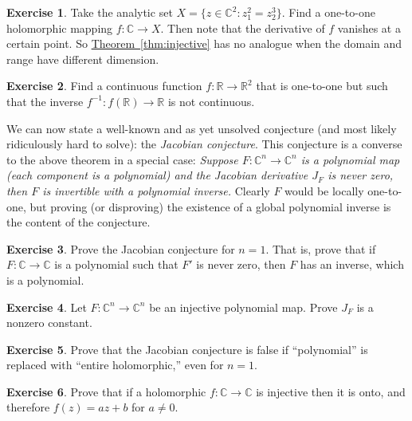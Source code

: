 \documentclass[12pt,openany]{book}
\newcommand{\C}{{\mathbb{C}}}
\newcommand{\R}{{\mathbb{R}}}
\newcommand{\myindex}[1]{#1\index{#1}}
\theoremstyle{plain}
\theoremstyle{remark}
\theoremstyle{definition}
\newenvironment{exbox}{%
    \def\FrameCommand{\vrule width 1pt \relax\hspace {10pt}}%
    \MakeFramed {\advance \hsize -\width \FrameRestore }%
}{%
    \endMakeFramed
}
\theoremstyle{exercise}
\newtheorem{exercise}{Exercise}[section]
\theoremstyle{example}
\newcommand{\thmref}[1]{\hyperref[#1]{Theorem~\ref*{#1}}}
\begin{document}
\begin{exbox}
\begin{exercise}
Take the analytic set
$X = \{ z \in \C^2 : z_1^2 = z_2^3 \}$.
Find a one-to-one holomorphic mapping $f \colon \C \to X$.
Then note that the derivative of $f$ vanishes at a certain point.
So \thmref{thm:injective} has no analogue when the domain and range have
different dimension.
\end{exercise}

\begin{exercise}
Find a continuous function $f \colon \R \to \R^2$ that is one-to-one but
such that the inverse $f^{-1} \colon f(\R) \to \R$ is not continuous.
\end{exercise}
\end{exbox}

We can now state a well-known and as yet unsolved conjecture (and most
likely ridiculously hard to solve):
the \emph{\myindex{Jacobian conjecture}}.
This conjecture is a converse to the above
theorem in a special case:
\emph{Suppose $F \colon \C^n \to \C^n$ is a polynomial map (each component is a
polynomial) and the Jacobian derivative $J_F$ is never zero, then $F$ is
invertible with a polynomial inverse.}
Clearly $F$ would be locally one-to-one, but proving (or
disproving)
the existence of a global polynomial inverse is the content of the conjecture.

\begin{exbox}
\begin{exercise}
Prove the Jacobian conjecture for $n=1$.  That is, prove that if
$F \colon \C \to \C$ is a polynomial such that $F'$ is never zero,
then $F$ has an inverse, which is a polynomial.
\end{exercise}

\begin{exercise}
Let $F \colon \C^n \to \C^n$ be an injective polynomial map.
Prove $J_F$ is a nonzero constant.
\end{exercise}

\begin{exercise}
Prove that the Jacobian conjecture is false if
``polynomial'' is replaced with ``entire holomorphic,'' even for $n=1$.
\end{exercise}

\begin{exercise}
Prove that if a holomorphic $f \colon \C \to \C$ is injective then it is
onto, and therefore $f(z) = az + b$ for $a \not= 0$.
\end{exercise}
\end{exbox}
\end{document}
